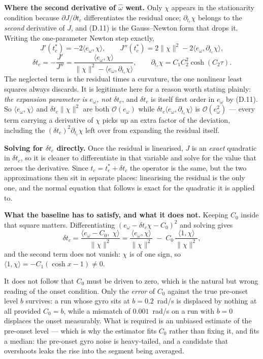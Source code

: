 \documentclass[11pt]{article}
\begin{document}
\textbf{Where the second derivative of $\hat\omega$ went.} Only $\chi$
appears in the stationarity condition because $\partial J/\partial t_c$
differentiates the residual once; $\partial_{t_c}\chi$ belongs to the
\emph{second} derivative of $J$, and (D.11) is the Gauss--Newton form
that drops it. Writing the one-parameter Newton step exactly,
\[
  J'(t_c^*) = -2\langle e_\omega,\chi\rangle,
  \qquad
  J''(t_c^*) = 2\|\chi\|^2 - 2\langle e_\omega,\partial_{t_c}\chi\rangle,
\]
\[
  \delta t_c = -\frac{J'}{J''}
  = \frac{\langle e_\omega,\chi\rangle}
         {\|\chi\|^2 - \langle e_\omega,\partial_{t_c}\chi\rangle},
  \qquad
  \partial_{t_c}\chi = C_1C_2^{2}\cosh(C_2\tau) .
\]
The neglected term is the residual times a curvature, the one nonlinear
least squares always discards. It is legitimate here for a reason worth
stating plainly: \emph{the expansion parameter is $e_\omega$, not
$\delta t_c$}, and $\delta t_c$ is itself first order in $e_\omega$ by
(D.11). So $\langle e_\omega,\chi\rangle$ and
$\delta t_c\|\chi\|^2$ are both $\mathcal{O}(e_\omega)$ while
$\delta t_c\langle e_\omega,\partial_{t_c}\chi\rangle$ is
$\mathcal{O}(e_\omega^2)$ --- every term carrying a derivative of
$\chi$ picks up an extra factor of the deviation, including the
$(\delta t_c)^2\partial_{t_c}\chi$ left over from expanding the
residual itself.

\textbf{Solving for $\delta t_c$ directly.} Once the residual is
linearised, $J$ is an \emph{exact} quadratic in $\delta t_c$, so it is
cleaner to differentiate in that variable and solve for the value that
zeroes the derivative. Since $t_c = t_c^* + \delta t_c$ the operator is
the same, but the two approximations then sit in separate places:
linearising the residual is the only one, and the normal equation that
follows is exact for the quadratic it is applied to.

\textbf{What the baseline has to satisfy, and what it does not.} Keeping
$C_0$ inside that square matters. Differentiating
$(e_\omega - \delta t_c\chi - C_0)^2$ and solving gives
\begin{equation}
  \delta t_c = \frac{\langle e_\omega - C_0,\;\chi\rangle}{\|\chi\|^2}
  = \frac{\langle e_\omega,\chi\rangle}{\|\chi\|^2}
    \;-\; C_0\,\frac{\langle 1,\chi\rangle}{\|\chi\|^2},
  \tag{D.11a}
\end{equation}
and the second term does not vanish: $\chi$ is of one sign, so
$\langle1,\chi\rangle = -C_1(\cosh x - 1)\ne0$.

It does not follow that $C_0$ must be driven to zero, which is the
natural but wrong reading of the onset condition. Only the \emph{error}
of $C_0$ against the true pre-onset level $b$ survives: a run whose gyro
sits at $b = 0.2$~rad/s is displaced by nothing at all provided
$C_0 = b$, while a mismatch of $0.001$~rad/s on a run with $b = 0$
displaces the onset measurably. What is required is an unbiased estimate
of the pre-onset level --- which is why the estimator fits $C_0$ rather
than fixing it, and fits a median: the pre-onset gyro noise is
heavy-tailed, and a candidate that overshoots leaks the rise into the
segment being averaged.
\end{document}
